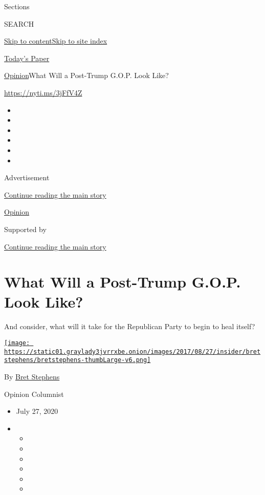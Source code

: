 Sections

SEARCH

\protect\hyperlink{site-content}{Skip to
content}\protect\hyperlink{site-index}{Skip to site index}

\href{https://myaccount.nytimes3xbfgragh.onion/auth/login?response_type=cookie\&client_id=vi}{}

\href{https://www.nytimes3xbfgragh.onion/section/todayspaper}{Today's
Paper}

\href{/section/opinion}{Opinion}\textbar{}What Will a Post-Trump G.O.P.
Look Like?

\url{https://nyti.ms/3jFfV4Z}

\begin{itemize}
\item
\item
\item
\item
\item
\item
\end{itemize}

Advertisement

\protect\hyperlink{after-top}{Continue reading the main story}

\href{/section/opinion}{Opinion}

Supported by

\protect\hyperlink{after-sponsor}{Continue reading the main story}

\hypertarget{what-will-a-post-trump-gop-look-like}{%
\section{What Will a Post-Trump G.O.P. Look
Like?}\label{what-will-a-post-trump-gop-look-like}}

And consider, what will it take for the Republican Party to begin to
heal itself?

\href{https://www.nytimes3xbfgragh.onion/by/bret-stephens}{\texttt{[image: https://static01.graylady3jvrrxbe.onion/images/2017/08/27/insider/bretstephens/bretstephens-thumbLarge-v6.png]}}

By \href{https://www.nytimes3xbfgragh.onion/by/bret-stephens}{Bret
Stephens}

Opinion Columnist

\begin{itemize}
\item
  July 27, 2020
\item
  \begin{itemize}
  \item
  \item
  \item
  \item
  \item
  \item
  \end{itemize}
\end{itemize}


